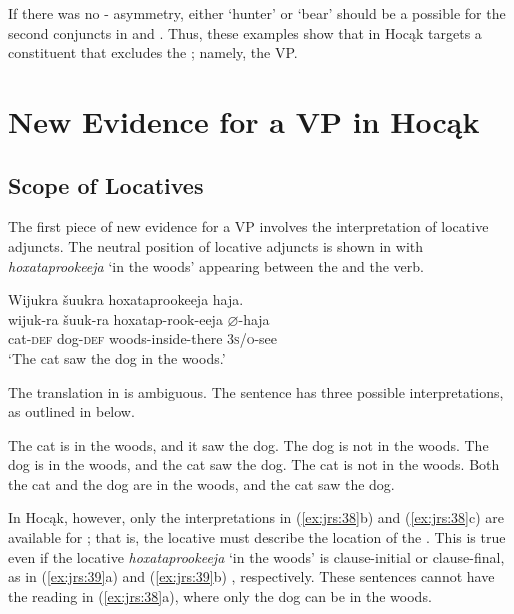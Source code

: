 \documentclass[output=paper]{LSP/langsci}
\begin{document}
 
If there was no - asymmetry, either `hunter' or `bear' should be a possible  for the second conjuncts in  and . Thus, these examples show that  in Hocąk targets a constituent that excludes the ; namely, the VP.
 

\section{New Evidence for a VP in Hocąk}\label{sec:jrs:4}

\subsection{Scope of Locatives}

The first piece of new evidence for a VP involves the interpretation of locative adjuncts. The neutral position of locative adjuncts is shown in  with \textit{hoxataprookeeja} `in the woods' appearing between the  and the verb.

\begin{exe}
\ex\label{ex:jrs:37} 
\glll Wijukra	\v{s}uukra		hoxataprookeeja		haja.\\
wijuk-ra	\v{s}uuk-ra		hoxatap-rook-eeja		$\varnothing$-haja \\
cat-\textsc{def}		dog-\textsc{def} 	woods-inside-there	\textsc{3s/o}-see \\
\trans `The cat saw the dog in the woods.' 
\end{exe}

The translation in  is ambiguous. The  sentence has three possible interpretations, as outlined in  below.

\begin{exe}
\ex\label{ex:jrs:38} 
\begin{xlist}
\ex \label{ex:jrs:38a} The cat is in the woods, and it saw the dog. The dog is not in the woods. 
\ex \label{ex:jrs:38b} The dog is in the woods, and the cat saw the dog. The cat is not in the woods.
\ex \label{ex:jrs:38c}Both the cat and the dog are in the woods, and the cat saw the dog.
\end{xlist}
\end{exe}

 
In Hocąk, however, only the interpretations in (\ref{ex:jrs:38}b) and (\ref{ex:jrs:38}c) are available for ; that is, the locative  must describe the location of the . This is true even if the locative \textit{hoxataprookeeja} `in the woods' is clause-initial or clause-final, as in (\ref{ex:jrs:39}a) and (\ref{ex:jrs:39}b) , respectively. These sentences cannot have the reading in (\ref{ex:jrs:38}a), where only the dog can be in the woods.
 
\end{document}
